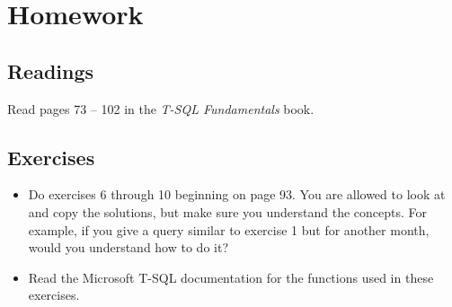 \documentclass{article}
\begin{document}
    \section{Homework}


        \subsection{Readings}
        Read pages 73 -- 102 in the \textit{T-SQL Fundamentals} book.

        
        \subsection{Exercises}

        \begin{itemize}
        \item Do exercises 6 through 10 beginning on page 93. You are allowed to look at and copy the solutions, but make sure you understand the concepts. For example, if you give a query similar to exercise 1 but for another month, would you understand how to do it?

        \item Read the Microsoft T-SQL documentation for the functions used in these exercises.
        \end{itemize}
\end{document}

